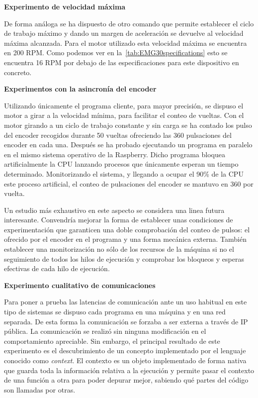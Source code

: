 \textbf{Experimento de velocidad máxima}

De forma análoga se ha dispuesto de otro comando que permite establecer el ciclo de trabajo máximo y dando un margen de aceleración se devuelve al velocidad máxima alcanzada.
Para el motor utilizado esta velocidad máxima se encuentra en 200 RPM\@.
Como podemos ver en la~\cref{tab:EMG30specifications} esto se encuentra 16 RPM por debajo de las especificaciones para este dispositivo en concreto.

\textbf{Experimentos con la asincronía del encoder}

Utilizando únicamente el programa cliente, para mayor precisión, se dispuso el motor a girar a la velocidad mínima, para facilitar el conteo de vueltas.
Con el motor girando a un ciclo de trabajo constante y sin carga se ha contado los pulso del encoder recogidos durante 50 vueltas ofreciendo las 360 pulsaciones del encoder en cada una.
Después se ha probado ejecutando un programa en paralelo en el mismo sistema operativo de la Raspberry.
Dicho programa bloquea artificialmente la CPU lanzando procesos que únicamente esperan un tiempo determinado.
Monitorizando el sistema, y llegando a ocupar el 90\% de la CPU este proceso artificial, el conteo de pulsaciones del encoder se mantuvo en 360 por vuelta.

Un estudio más exhaustivo en este aspecto se considera una linea futura interesante.
Convendría mejorar la forma de establecer unas condiciones de experimentación que garanticen una doble comprobación del conteo de pulsos: el ofrecido por el encoder en el programa y una forma mecánica externa.
También establecer una monitorización no sólo de los recursos de la máquina si no el seguimiento de todos los hilos de ejecución y comprobar los bloqueos y esperas efectivas de cada hilo de ejecución.

\textbf{Experimento cualitativo de comunicaciones}

Para poner a prueba las latencias de comunicación ante un uso habitual en este tipo de sistemas se dispuso cada programa en una máquina y en una red separada.
De esta forma la comunicación se forzaba a ser externa a través de IP pública.
La comunicación se realizó sin ninguna modificación en el comportamiento apreciable.
Sin embargo, el principal resultado de este experimento es el descubrimiento de un concepto implementado por el lenguaje conocido como \textit{context}.
El contexto es un objeto implementado de forma nativa que guarda toda la información relativa a la ejecución y permite pasar el contexto de una función a otra para poder depurar mejor, sabiendo qué partes del código son llamadas por otras.

